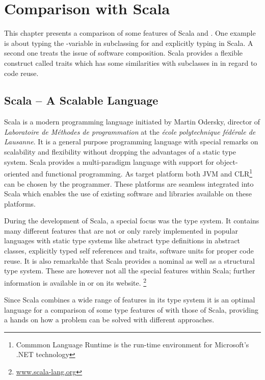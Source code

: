 \chapter{Comparison with Scala}
\label{sec:comparisonScala}
This chapter presents a comparison of some features of Scala and \ooplss.
One example is about typing the \self-variable in subclassing for
\ooplss and explicitly typing in Scala. A second one treats the
issue of software composition. Scala provides a flexible construct called
traits which has some similarities with subclasses in \ooplss in regard to
code reuse.

\section{Scala -- A Scalable Language}
Scala is a modern programming language initiated by Martin Odersky,
director of \emph{Laboratoire de Méthodes de programmation} at the
\emph{école polytechnique fédérale de Lausanne}. It is a general
purpose programming language with special remarks on scalability
and flexibility without dropping the advantages of a static type
system. Scala provides a multi-paradigm language with support for
object-oriented and functional programming. As target platform both JVM
and CLR\footnote{Commmon Language Runtime is the run-time environment
for Microsoft's .NET technology} can be chosen by the programmer. These
platforms are seamless integrated into Scala which enables the use of
existing software and libraries available on these platforms.

During the development of Scala, a special focus was the type system.
It contains many different features that are not or
only rarely implemented in popular languages with static type systems
like abstract type definitions in abstract classes, explicitly typed self
references and traits, software units for proper code reuse. It is also
remarkable that Scala provides a nominal as well as a structural
type system. These are however not all the special features within
Scala; further information is available in
\cite{odersky_scala_2010,odersky_programming_2008} or on its website.
\footnote{\href{http://www.scala-lang.org/}{www.scala-lang.org}}

Since Scala combines a wide range of features in its type system it is
an optimal language for a comparison of some type features of \ooplss
with those of Scala, providing a hands on how a problem can be solved
with different approaches.


